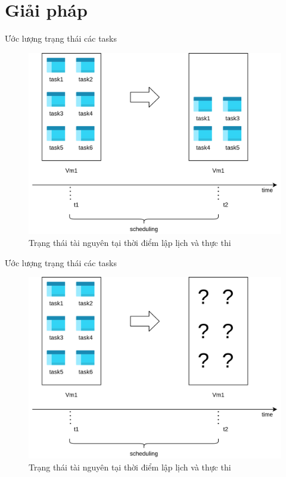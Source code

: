 \documentclass[11pt,xcolor={dvipsnames}, aspectratio=169]{beamer}
\begin{document}
\section{Giải pháp} 

\begin{frame}
{Ước lượng trạng thái các tasks}
\begin{figure}
	\centering
	\includegraphics[scale=0.5]{images/predicting_status1.png}
	\caption{Trạng thái tài nguyên tại thời điểm lập lịch và thực thi}
\end{figure}
\end{frame}

\begin{frame}
{Ước lượng trạng thái các tasks}
\begin{figure}
	\centering
	\includegraphics[scale=0.5]{images/predicting_status2.png}
	\caption{Trạng thái tài nguyên tại thời điểm lập lịch và thực thi}
\end{figure}
\end{frame}
\end{document}
